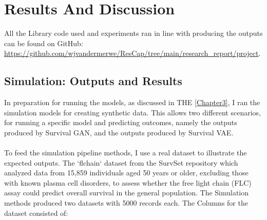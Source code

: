 \chapter{Results And Discussion}
\label{Chapter4}
All the Library code used and experiments ran in line with producing the outputs can be found on GitHub: \url{https://github.com/wjvandermerwe/ResCap/tree/main/research_report/project}.

\section{Simulation: Outputs and Results}
In preparation for running the models, as discussed in THE \ref{Chapter3}, I ran the simulation models for creating synthetic data. This allows two different scenarios, for running a specific model and predicting outcomes, namely the outputs produced by Survival GAN, and the outputs produced by Survival VAE.
\\\\
\noindent To feed the simulation pipeline methods, I use a real dataset to illustrate the expected outputs. The `flchain` dataset \parencite{dispenzieri_use_2012} from the SurvSet repository \parencite{drysdale_survset_2022} which analyzed data from 15,859 individuals aged 50 years or older, excluding those with known plasma cell disorders, to assess whether the free light chain (FLC) assay could predict overall survival in the general population. The Simulation methods produced two datasets with 5000 records each. The Columns for the dataset consisted of:
 
